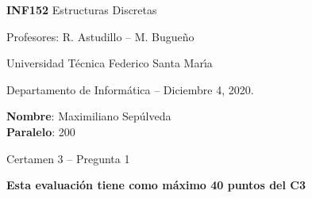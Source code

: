 \documentclass[legalpaper,10pt]{article}
\begin{document}
\thispagestyle{empty}

\begin{minipage}[t]{0.6\textwidth}

{\LARGE \textbf{INF152} Estructuras Discretas}

{\large Profesores: R. Astudillo -- M. Bugueño}

Universidad T\'ecnica Federico Santa Mar\'{\i}a

Departamento de Inform\'atica -- Diciembre 4, 2020.

\end{minipage}
\hfill
\begin{minipage}[t]{0.35\textwidth}
\textbf{Nombre}: Maximiliano Sepúlveda \\[0.3cm]
  \textbf{Paralelo}: 200
\end{minipage}

\vspace{0.8cm}

{\Large Certamen 3 -- Pregunta 1}

\vspace{0.4cm}

\textbf{Esta evaluación tiene como máximo 40 puntos del C3}
\end{document}
